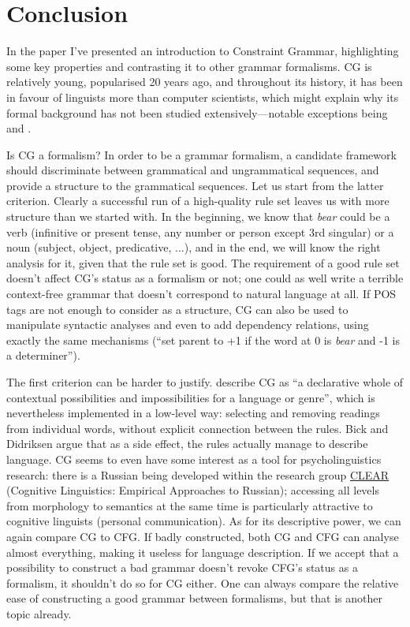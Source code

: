 
\section*{Conclusion}

In the paper I've presented an introduction to Constraint Grammar,
highlighting some key properties and contrasting it to other grammar
formalisms.
CG is relatively young, popularised 20 years ago, and throughout its
history, it has been in favour of linguists more than computer
scientists, which might explain why its formal background has not been
studied extensively---notable exceptions being \cite{lager98} and \cite{lager_nivre01}.
 
Is CG a formalism? In order to be a grammar formalism, a candidate
framework should discriminate between grammatical and ungrammatical
sequences, and provide a structure to the grammatical sequences.
Let us start from the latter criterion. Clearly a successful run of a
high-quality rule set leaves us with more structure than we started
with. In the beginning, we know that \emph{bear} could be a verb
(infinitive or present tense, any number or person except 3rd
singular) or a noun (subject, object, predicative, ...), and in the end, we
will know the right analysis for it, given that the rule set is
good. The requirement of a good rule set doesn't affect CG's status as
a formalism or not; one could as well write a terrible context-free
grammar that doesn't correspond to natural language at all.
If POS tags are not enough to consider as a structure,
CG can also be used to manipulate syntactic analyses and even to add
dependency relations, using exactly the same mechanisms (``set parent to +1 if the word at 0 is \emph{bear} and -1 is a determiner'').

The first criterion can be harder to justify. \cite{bick2015} describe CG as ``a
declarative whole of contextual possibilities and impossibilities for
a language or genre'', which is nevertheless implemented in a
low-level way: selecting and removing readings from individual words,
without explicit connection between the rules. Bick and Didriksen
argue that as a side effect, the rules actually manage to describe language.
CG seems to even have some interest as a tool for psycholinguistics research:
there is a Russian being developed within the research group
 \href{https://uit.no/forskning/forskningsgrupper/gruppe?p_document_id=344365}{CLEAR
} (Cognitive Linguistics: Empirical Approaches to Russian); accessing
all levels from morphology to semantics at the same time is particularly attractive to cognitive linguists (personal communication).
As for its descriptive power, we can again compare CG to CFG. If
badly constructed, both CG and CFG can analyse almost everything,
making it useless for language description. If we accept that a
possibility to construct a bad grammar doesn't revoke CFG's status as
a formalism, it shouldn't do so for CG either. One can always compare
the relative ease of constructing a good grammar between formalisms,
but that is another topic already.

